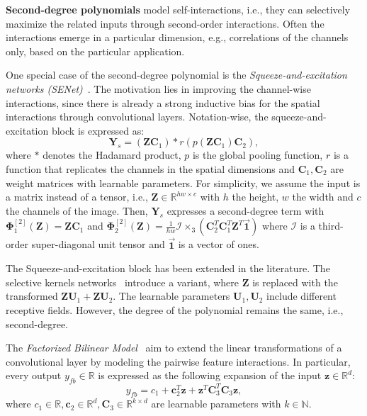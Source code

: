 \documentclass[runningheads]{llncs}
\newcommand{\sne}{SENet}
\newcommand{\realnum}{\mathbb{R}}
\providecommand{\naturalnum}{\mathbb{N}}
\providecommand{\invar}{z}
\providecommand{\binvar}{\bm{\invar}}
\providecommand{\minvar}{\bm{Z}}
\providecommand{\matr}{\bm{\Phi}}
\providecommand{\matra}[2]{\matr_{#1}^{[#2]}}
\providecommand\eg{e.g.,}
\providecommand\ie{i.e.,}
\begin{document}
\noindent\textbf{Second-degree polynomials} model self-interactions, \ie{} they can selectively maximize the related inputs through second-order interactions. 
Often the interactions emerge in a particular dimension, \eg{} correlations of the channels only, based on the particular application. 

One special case of the second-degree polynomial is the \emph{Squeeze-and-excitation networks (\sne)}~\cite{hu2018squeeze}. The motivation lies in improving the channel-wise interactions, since there is already a strong inductive bias for the spatial interactions through convolutional layers. Notation-wise, the squeeze-and-excitation block is expressed as:
\begin{equation}
    {\bm{Y}}_{s} = (\minvar\bm{C}_1) * r(p(\minvar\bm{C}_1)\bm{C}_2),
    \label{eq:nosharing_senet_block}
\end{equation}
where $*$ denotes the Hadamard product, $p$ is the global pooling function, $r$ is a function that replicates the channels in the spatial dimensions and $\bm{C}_1, \bm{C}_2$ are weight matrices with learnable parameters. For simplicity, we assume the input is a matrix instead of a tensor, \ie{} $\minvar \in \realnum^{hw \times c}$ with $h$ the height, $w$ the width and $c$ the channels of the image. 
Then, ${\bm{Y}}_{s}$ expresses a second-degree term with $\matra{1}{2}(\minvar) = \minvar\bm{C}_1$ and $\matra{2}{2}(\minvar) = \frac{1}{hw} \bm{\mathcal{I}} \times_3 (\bm{C}_2^T\bm{C}_1^T \minvar^T \overrightarrow{\bm{1}})$ where $\bm{\mathcal{I}}$ is a third-order super-diagonal unit tensor and $\overrightarrow{\bm{1}}$ is a vector of ones. 





The Squeeze-and-excitation block has been extended in the literature. The selective kernels networks~\cite{li2019selective} introduce a variant, where $\minvar$ is replaced with the transformed $\minvar \bm{U}_1 + \minvar\bm{U}_2$. The learnable parameters $\bm{U}_1, \bm{U}_2$ include different receptive fields. However, the degree of the polynomial remains the same, \ie{} second-degree.

The \emph{Factorized Bilinear Model}~\cite{li2017factorized} aim to extend the linear transformations of a convolutional layer by modeling the pairwise feature interactions. In particular, every output $y_{fb} \in \realnum$ is expressed as the following expansion of the input $\binvar \in \realnum^d$:
\begin{equation}
    y_{fb} = c_1 + \bm{c}_2^T\binvar + \binvar^T \bm{C}_3^T \bm{C}_3 \binvar,
    \label{eq:nosharing_factorized_bilinear_block}
\end{equation}
where $c_1 \in \realnum, \bm{c}_2 \in \realnum^d, \bm{C}_3 \in \realnum^{k\times d}$ are learnable parameters with $k \in \naturalnum$.
\end{document}
